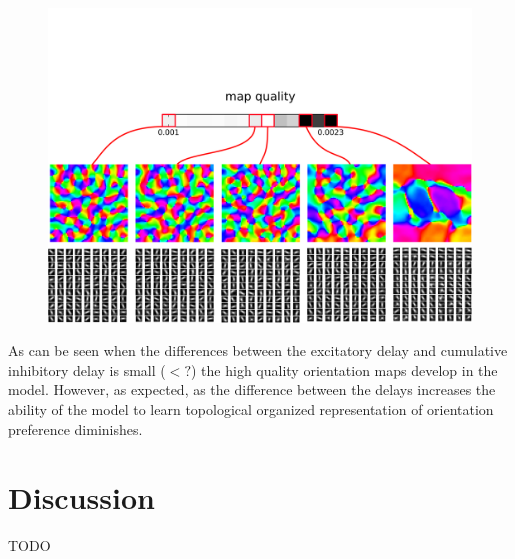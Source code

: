 \documentclass[a4paper,10pt]{article}
\begin{document}
\begin{figure}[htpb!] 
\centering
\includegraphics[width=16cm]{./SVG/Figure4/figure4.png}
\caption{}
\label{fig:figure3}
\end{figure} 

As can be seen when the differences between the excitatory delay and cumulative inhibitory delay is small ($\less ?$) the high quality orientation maps develop in the model. However, as expected, as the difference between the delays increases the ability of the model to learn topological organized representation of orientation preference diminishes.

\section{Discussion}

TODO



\end{document}
